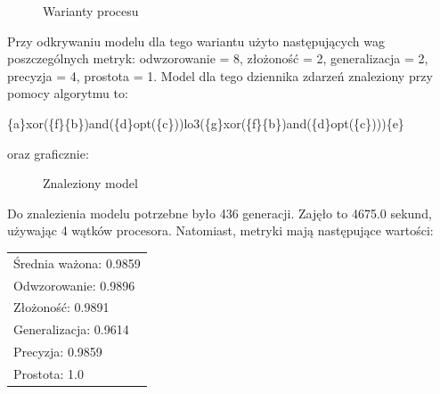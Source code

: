 \begin{figure}[H]
	\caption{\label{fig:flow_chart}Warianty procesu}
\end{figure}

Przy odkrywaniu modelu dla tego wariantu użyto następujących wag poszczególnych metryk: odwzorowanie = 8, złożoność = 2, generalizacja = 2, precyzja = 4, prostota = 1. Model dla tego dziennika zdarzeń znaleziony przy pomocy algorytmu to:
\begin{center}
	\{a\}xor(\{f\}\{b\})and(\{d\}opt(\{c\}))lo3(\{g\}xor(\{f\}\{b\})and(\{d\}opt(\{c\})))\{e\}
\end{center}
oraz graficznie:

\begin{figure}[H]
	\caption{\label{fig:flow_chart}Znaleziony model}
\end{figure}

Do znalezienia modelu potrzebne było 436 generacji. Zajęło to 4675.0 sekund, używając 4 wątków procesora. Natomiast, metryki mają następujące wartości: 

 \begin{center}
  \begin{tabular}{l}
	Średnia ważona: 0.9859 \\
	Odwzorowanie: 0.9896 \\
	Złożoność: 0.9891 \\
	Generalizacja: 0.9614 \\
	Precyzja: 0.9859 \\
	Prostota: 1.0
  \end{tabular}
 \end{center}
 
